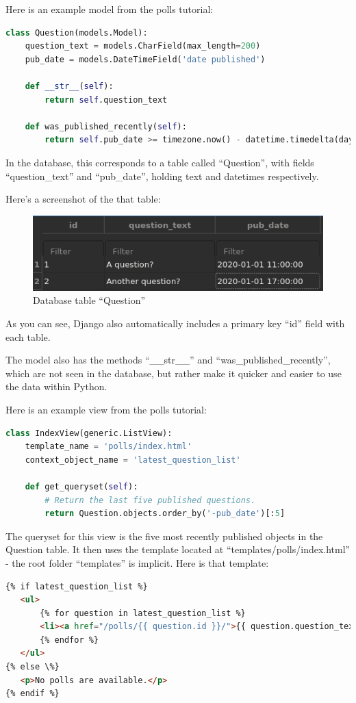 \documentclass{article}
\begin{document}
Here is an example model from the polls tutorial:
\begin{lstlisting}[language=Python, breaklines]
class Question(models.Model):
    question_text = models.CharField(max_length=200)
    pub_date = models.DateTimeField('date published')

    def __str__(self):
        return self.question_text

    def was_published_recently(self):
        return self.pub_date >= timezone.now() - datetime.timedelta(days=1)
\end{lstlisting}

In the database,
this corresponds to a table called ``Question'',
with fields ``question\_text'' and ``pub\_date'',
holding text and datetimes respectively.

Here's a screenshot of the that table:

\begin{figure}[h!]
	\includegraphics[width=\linewidth]{Images/question_table.png}
	\caption{Database table ``Question''}
	\label{fig:database1}
\end{figure}

As you can see,
Django also automatically includes a primary key ``id'' field with each table.

The model also has the methods ``\_\_str\_\_'' and ``was\_published\_recently'',
which are not seen in the database,
but rather make it quicker and easier to use the data within Python.

Here is an example view from the polls tutorial:
\begin{lstlisting}[language=Python, breaklines]
class IndexView(generic.ListView):
    template_name = 'polls/index.html'
    context_object_name = 'latest_question_list'

    def get_queryset(self):
        # Return the last five published questions.
        return Question.objects.order_by('-pub_date')[:5]
\end{lstlisting}

The queryset for this view is the five most recently published objects in the Question table.
It then uses the template located at ``templates/polls/index.html'' -
the root folder ``templates'' is implicit.
Here is that template:
\begin{lstlisting}[language=HTML, breaklines]
{% if latest_question_list %}
   <ul>
       {% for question in latest_question_list %}
       <li><a href="/polls/{{ question.id }}/">{{ question.question_text }}</a></li>
       {% endfor %}
   </ul>
{% else \%}
   <p>No polls are available.</p>
{% endif %}
\end{lstlisting}
\end{document}
